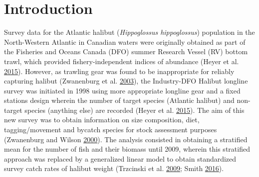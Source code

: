 \documentclass[12pt]{article}\usepackage[]{graphicx}\usepackage[]{color}
\begin{document}

\frontmatter


\renewcommand{\headrulewidth}{0.5pt}  %
\renewcommand{\footrulewidth}{0.5pt}  %

\newcommand{\lt}{\ensuremath <}
\newcommand{\gt}{\ensuremath >}


\hypertarget{sec:introduction}{%
\section{Introduction}\label{sec:introduction}}

Survey data for the Atlantic halibut (\emph{Hippoglossus hippoglossus}) population in the North-Western Atlantic in Canadian waters were originally obtained as part of the Fisheries and Oceans Canada (DFO) summer Research Vessel (RV) bottom trawl, which provided fishery-independent indices of abundance (Heyer et al. \protect\hyperlink{ref-DenHeyer2015}{2015}). However, as trawling gear was found to be inappropriate for reliably capturing halibut (Zwanenburg et al. \protect\hyperlink{ref-Zwanenburg2003}{2003}), the Industry-DFO Halibut longline survey was initiated in 1998 using more appropriate longline gear and a fixed stations design wherein the number of target species (Atlantic halibut) and non-target species (anything else) are recorded (Heyer et al. \protect\hyperlink{ref-DenHeyer2015}{2015}). The aim of this new survey was to obtain information on size composition, diet, tagging/movement and bycatch species for stock assessment purposes (Zwanenburg and Wilson \protect\hyperlink{ref-Zwanenburg2000}{2000}). The analysis consisted in obtaining a stratified mean for the number of fish and their biomass until 2009, wherein this stratified approach was replaced by a generalized linear model to obtain standardized survey catch rates of halibut weight (Trzcinski et al. \protect\hyperlink{ref-Trzcinski2009}{2009}; Smith \protect\hyperlink{ref-Smith2016a}{2016}).
\end{document}
